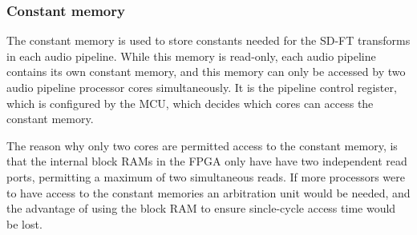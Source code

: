 \subsubsection{Constant memory}

The constant memory is used to store constants needed for the SD-FT transforms
in each audio pipeline. While this memory is read-only, each audio pipeline
contains its own constant memory, and this memory can only be accessed by two
audio pipeline processor cores simultaneously. It is the pipeline control
register, which is configured by the MCU, which decides which cores can access
the constant memory.

The reason why only two cores are permitted access to the constant memory, is
that the internal block RAMs in the FPGA only have have two independent
read ports, permitting a maximum of two simultaneous reads. If more processors
were to have access to the constant memories an arbitration unit would be
needed, and the advantage of using the block RAM to ensure sincle-cycle access
time would be lost.
